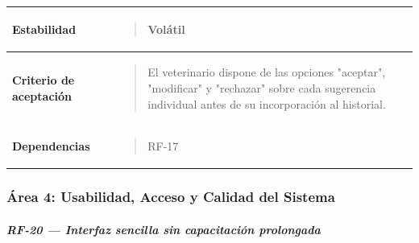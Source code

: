 \documentclass[
]{article}
\newcounter{none} %
\begin{document}
{\def\LTcaptype{none} %
\begin{longtable}[]{@{}
  >{\raggedright\arraybackslash}p{}
  >{\raggedright\arraybackslash}p{}@{}}
\toprule\noalign{}
\begin{minipage}[b]{\linewidth}\raggedright
\textbf{Estabilidad}
\end{minipage} & \begin{minipage}[b]{\linewidth}\raggedright
\begin{quote}
Volátil
\end{quote}
\end{minipage} \\
\midrule\noalign{}
\endhead
\bottomrule\noalign{}
\endlastfoot
\textbf{Criterio de aceptación} &
\begin{minipage}[t]{\linewidth}\raggedright
\begin{quote}
El veterinario dispone de las opciones "aceptar", "modificar" y
"rechazar" sobre cada sugerencia individual antes de su incorporación al
historial.
\end{quote}
\end{minipage} \\
\textbf{Dependencias} & \begin{minipage}[t]{\linewidth}\raggedright
\begin{quote}
RF-17
\end{quote}
\end{minipage} \\
\end{longtable}
}

\subsubsection{Área 4: Usabilidad, Acceso y Calidad del
Sistema}\label{uxe1rea-4-usabilidad-acceso-y-calidad-del-sistema}

\subparagraph{RF-20 --- Interfaz sencilla sin capacitación
prolongada}\label{rf-20-interfaz-sencilla-sin-capacitaciuxf3n-prolongada}
\end{document}
